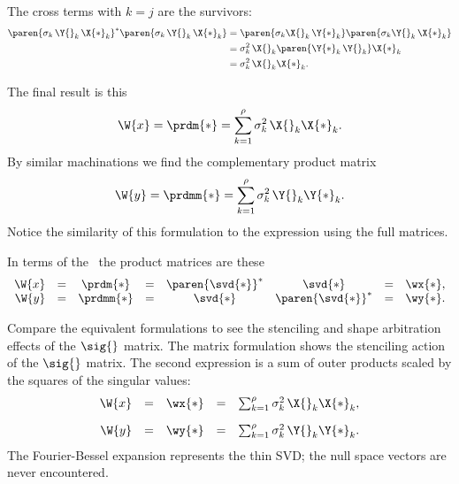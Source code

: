 The cross terms with $k=j$ are the survivors:
\begin{equation}
  \begin{split}
    \paren{\sigma_{k}\, \Y{}_{k}\, \X{*}_{k}}^{*}\paren{\sigma_{k}\, \Y{}_{k}\, \X{*}_{k}}&= \paren{\sigma_{k}\X{}_{k}\, \Y{*}_{k}}\paren{\sigma_{k}\Y{}_{k}\, \X{*}_{k}} \\
    &= \sigma_{k}^{2}\,\X{}_{k}\paren{\Y{*}_{k}\,\Y{}_{k}}\X{*}_{k}\\
    &= \sigma_{k}^{2}\,\X{}_{k}\X{*}_{k}.
  \end{split}
\end{equation}

The final result is this
\begin{equation}
  \W{x} = \prdm{*} = \sum_{k=1}^{\rho}{\sigma_{k}^{2}\,\X{}_{k}\X{*}_{k}}.
\end{equation}
By similar machinations we find the complementary product matrix
\begin{equation}
  \W{y} = \prdmm{*} = \sum_{k=1}^{\rho}{\sigma_{k}^{2}\,\Y{}_{k}\Y{*}_{k}}.
\end{equation}
Notice the similarity of this formulation to the expression using the full matrices.

In terms of the \svdl \ the product matrices are these
\begin{equation}
  \begin{array}{rccccccl}
    \W{x} &=& \prdm{*}  &=& \paren{\svd{*}}^{*}&\svd{*} &=& \wx{*},\\
    \W{y} &=& \prdmm{*} &=& \svd{*}&\paren{\svd{*}}^{*} &=& \wy{*}.
  \end{array}
\end{equation}

Compare the equivalent formulations to see the stenciling and shape arbitration effects of the $\sig{}$ matrix. The matrix formulation shows the stenciling action of the $\sig{}$ matrix. The second expression is a sum of outer products scaled by the squares of the singular values:
\begin{equation}
  \begin{array}{rcccc}
    \W{x} &=& \wx{*} &=& \sum_{k=1}^{\rho}{\sigma_{k}^{2}\,\X{}_{k}\X{*}_{k}},\\[10pt]
    \W{y} &=& \wy{*} &=& \sum_{k=1}^{\rho}{\sigma_{k}^{2}\,\Y{}_{k}\Y{*}_{k}}.
  \end{array}
\end{equation}
The Fourier-Bessel expansion represents the thin SVD; the null space vectors are never encountered.

